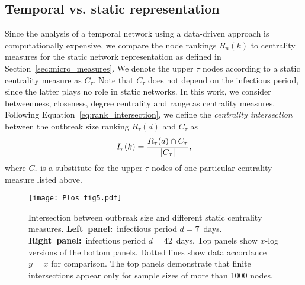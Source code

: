 \subsection{Temporal vs. static representation}
Since the analysis of a temporal network using a data-driven approach is computationally expensive, we compare the node rankings $R_n(k)$ to centrality measures for the static network representation as defined in Section~\ref{sec:micro_measures}.
We denote the upper $\tau $ nodes according to a static centrality measure as $C_\tau $.
Note that $C_\tau $ does not depend on the infectious period, since the latter plays no role in static networks.
In this work, we consider betweenness, closeness, degree centrality and range as centrality measures.
Following Equation~\eqref{eq:rank_intersection}, we define the \emph{centrality intersection} between the outbreak size ranking $R_\tau (d)$ and $C_\tau $ as
\begin{equation}\label{eq:centrality_intersection}
I_\tau (k)=\frac{R_\tau (d) \cap C_\tau}{\left| C_\tau \right|},
\end{equation}
where $C_\tau $ is a substitute for the upper $\tau $ nodes of one particular centrality measure listed above.
%
\begin{figure}[htb]
\begin{center}
\texttt{[image: Plos\_fig5.pdf]}
\caption{Intersection between outbreak size and different static centrality measures.
\textbf{Left~panel:}~infectious period $d=7$~days.
\textbf{Right~panel:}~infectious period $d=42$~days.
Top panels show $x$-log versions of the bottom panels. 
Dotted lines show data accordance $y=x$ for comparison.
The top panels demonstrate that finite intersections appear only for sample sizes of more than 1000 nodes.}
\label{fig:plos_fig5}
\end{center}
\end{figure}

